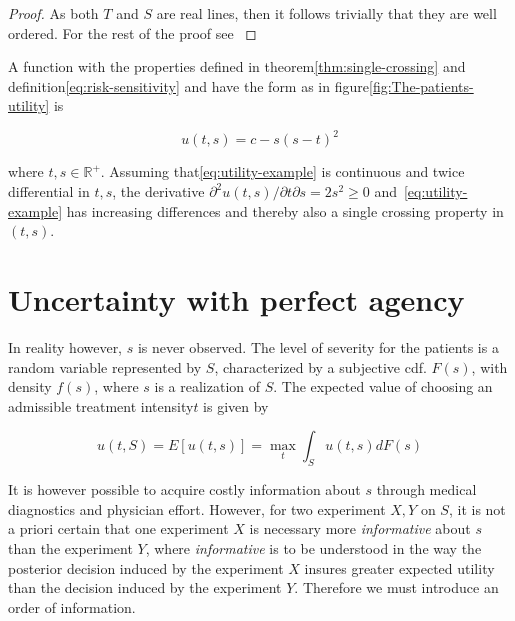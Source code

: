 \documentclass[10pt,a4paper]{article} %
\begin{document}
\begin{proof}
As both $T$ and $S$ are real lines, then it follows trivially that they are well ordered. For the rest of the proof see \citet{Milgrom1994}
\end{proof}

\begin{example}
A function with the properties defined in theorem\ref{thm:single-crossing} and definition\ref{eq:risk-sensitivity} and have the form as in figure\ref{fig:The-patients-utility} is

\begin{equation}
u(t,s)=c-s{(s-t)}^{2}\label{eq:utility-example}
\end{equation}

where $t,s\in\mathbb{R}^{+}$. Assuming that\eqref{eq:utility-example} is continuous and twice differential in $t,s$, the derivative $\partial^{2}u(t,s)\big/\partial t\partial s=2s^{2}\ge0$ and~\eqref{eq:utility-example} has increasing differences and thereby also a single crossing property in $(t,s)$.
\end{example}


\section{Uncertainty with perfect agency}

In reality however, $s$ is never observed. The level of severity for the patients is a random variable represented by $S$, characterized by a subjective cdf. $F(s)$, with density $f(s)$, where $s$ is a realization of $S$. The expected value of choosing an admissible treatment intensity$t$ is given by

\begin{equation}
u(t,S)=E[u(t,s)]=\max_{t}\int_{S}u(t,s)dF(s)\label{eq:expected-utility-prior}
\end{equation}

It is however possible to acquire costly information about $s$ through medical diagnostics and physician effort. However, for two experiment $X,Y$ on $S$, it is not a priori certain that one experiment $X$ is necessary more \emph{informative} about $s$ than the experiment $Y$, where \emph{informative} is to be understood in the way the posterior decision induced by the experiment $X$ insures greater expected utility than the decision induced by the experiment $Y$. Therefore we must introduce an order of information.
\end{document}
